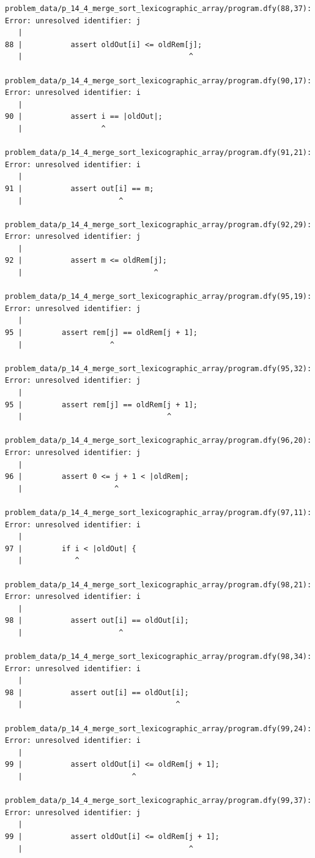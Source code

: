 \documentclass{article}
\begin{document}
\begin{lstlisting}
problem_data/p_14_4_merge_sort_lexicographic_array/program.dfy(88,37): Error: unresolved identifier: j
   |
88 |           assert oldOut[i] <= oldRem[j];
   |                                      ^

problem_data/p_14_4_merge_sort_lexicographic_array/program.dfy(90,17): Error: unresolved identifier: i
   |
90 |           assert i == |oldOut|;
   |                  ^

problem_data/p_14_4_merge_sort_lexicographic_array/program.dfy(91,21): Error: unresolved identifier: i
   |
91 |           assert out[i] == m;
   |                      ^

problem_data/p_14_4_merge_sort_lexicographic_array/program.dfy(92,29): Error: unresolved identifier: j
   |
92 |           assert m <= oldRem[j];
   |                              ^

problem_data/p_14_4_merge_sort_lexicographic_array/program.dfy(95,19): Error: unresolved identifier: j
   |
95 |         assert rem[j] == oldRem[j + 1];
   |                    ^

problem_data/p_14_4_merge_sort_lexicographic_array/program.dfy(95,32): Error: unresolved identifier: j
   |
95 |         assert rem[j] == oldRem[j + 1];
   |                                 ^

problem_data/p_14_4_merge_sort_lexicographic_array/program.dfy(96,20): Error: unresolved identifier: j
   |
96 |         assert 0 <= j + 1 < |oldRem|;
   |                     ^

problem_data/p_14_4_merge_sort_lexicographic_array/program.dfy(97,11): Error: unresolved identifier: i
   |
97 |         if i < |oldOut| {
   |            ^

problem_data/p_14_4_merge_sort_lexicographic_array/program.dfy(98,21): Error: unresolved identifier: i
   |
98 |           assert out[i] == oldOut[i];
   |                      ^

problem_data/p_14_4_merge_sort_lexicographic_array/program.dfy(98,34): Error: unresolved identifier: i
   |
98 |           assert out[i] == oldOut[i];
   |                                   ^

problem_data/p_14_4_merge_sort_lexicographic_array/program.dfy(99,24): Error: unresolved identifier: i
   |
99 |           assert oldOut[i] <= oldRem[j + 1];
   |                         ^

problem_data/p_14_4_merge_sort_lexicographic_array/program.dfy(99,37): Error: unresolved identifier: j
   |
99 |           assert oldOut[i] <= oldRem[j + 1];
   |                                      ^


\end{lstlisting}
\end{document}
